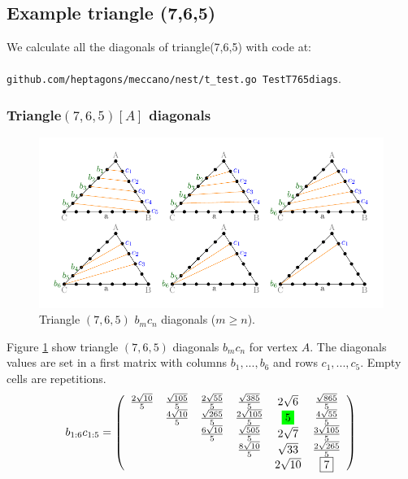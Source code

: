 \documentclass[11pt]{article}
\begin{document}
\newcommand\five{\colorbox{green}{$5$}}

\subsection{Example triangle (7,6,5)}
We calculate all the diagonals of triangle(7,6,5) with code at:
\\\\
\texttt{github.com/heptagons/meccano/nest/t\_test.go TestT765diags}.

\subsubsection{Triangle$(7,6,5)[A]$ diagonals}

\begin{figure}[htp]
\centering
\includegraphics[scale=1]{t765bc}
\caption{Triangle $(7,6,5)$ $b_mc_n$ diagonals ($m \ge n$).}
\label{t765bc}
\end{figure}
Figure \ref{t765bc} show triangle $(7,6,5)$ diagonals $b_mc_n$ for vertex $A$.
The diagonals values are set in a first matrix with columns $b_1,...,b_6$ and rows $c_1,...,c_5$. Empty cells are repetitions.
\begin{equation}\label{eq:appendrow}
b_{1:6}c_{1:5} = \left(\begin{array}{cccccc}
	\frac{2\sqrt{10}}{5} & \frac{\sqrt{105}}{5} & \frac{2\sqrt{55}}{5} & \frac{\sqrt{385}}{5} & 2\sqrt{6} & \frac{\sqrt{865}}{5} \\
	& \frac{4\sqrt{10}}{5} & \frac{\sqrt{265}}{5} & \frac{2\sqrt{105}}{5} & \five & \frac{4\sqrt{55}}{5} \\
	& & \frac{6\sqrt{10}}{5} & \frac{\sqrt{505}}{5} & 2\sqrt{7} & \frac{3\sqrt{105}}{5}\\
	& & & \frac{8\sqrt{10}}{5} & \sqrt{33} & \frac{2\sqrt{265}}{5}\\
	& & & & 2\sqrt{10} & \boxed{7} \\
\end{array}\right)
\end{equation}
\end{document}
